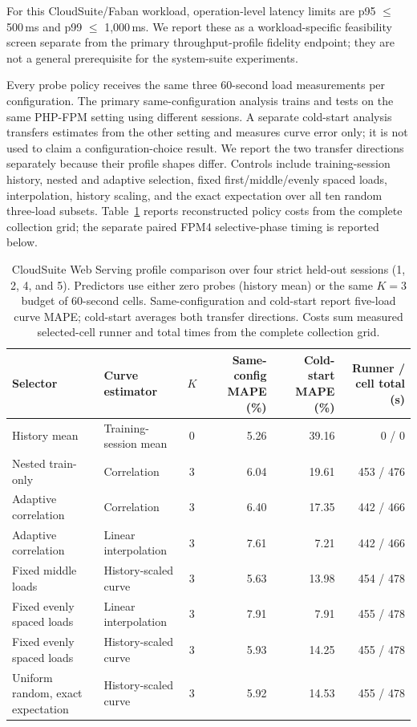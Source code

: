 \documentclass[sigconf, review, anonymous, balance=false]{acmart}
\begin{document}
For this CloudSuite/Faban workload, operation-level latency limits are p95 $\leq$ 500\,ms and p99 $\leq$ 1,000\,ms. We report these as a workload-specific feasibility screen separate from the primary throughput-profile fidelity endpoint; they are not a general prerequisite for the system-suite experiments.

Every probe policy receives the same three 60-second load measurements per configuration. The primary same-configuration analysis trains and tests on the same PHP-FPM setting using different sessions. A separate cold-start analysis transfers estimates from the other setting and measures curve error only; it is not used to claim a configuration-choice result. We report the two transfer directions separately because their profile shapes differ. Controls include training-session history, nested and adaptive selection, fixed first/middle/evenly spaced loads, interpolation, history scaling, and the exact expectation over all ten random three-load subsets. Table~\ref{tab:cloudsuite-web-profiles} reports reconstructed policy costs from the complete collection grid; the separate paired FPM4 selective-phase timing is reported below.

\begin{table}[t]
\centering
\caption{CloudSuite Web Serving profile comparison over four strict held-out sessions (1, 2, 4, and 5). Predictors use either zero probes (history mean) or the same $K=3$ budget of 60-second cells. Same-configuration and cold-start report five-load curve MAPE; cold-start averages both transfer directions. Costs sum measured selected-cell runner and total times from the complete collection grid.}
\label{tab:cloudsuite-web-profiles}
\scriptsize
\setlength{\tabcolsep}{4pt}
\begin{tabular}{llcrrr}
\toprule
\textbf{Selector} & \textbf{Curve estimator} & \textbf{$K$} & \textbf{Same-config MAPE (\%)} & \textbf{Cold-start MAPE (\%)} & \textbf{Runner / cell total (s)} \\
\midrule
History mean & Training-session mean & 0 & 5.26 & 39.16 & 0 / 0 \\
Nested train-only & Correlation & 3 & 6.04 & 19.61 & 453 / 476 \\
Adaptive correlation & Correlation & 3 & 6.40 & 17.35 & 442 / 466 \\
Adaptive correlation & Linear interpolation & 3 & 7.61 & 7.21 & 442 / 466 \\
Fixed middle loads & History-scaled curve & 3 & 5.63 & 13.98 & 454 / 478 \\
Fixed evenly spaced loads & Linear interpolation & 3 & 7.91 & 7.91 & 455 / 478 \\
Fixed evenly spaced loads & History-scaled curve & 3 & 5.93 & 14.25 & 455 / 478 \\
Uniform random, exact expectation & History-scaled curve & 3 & 5.92 & 14.53 & 455 / 478 \\
\bottomrule
\end{tabular}
\end{table}
\end{document}
